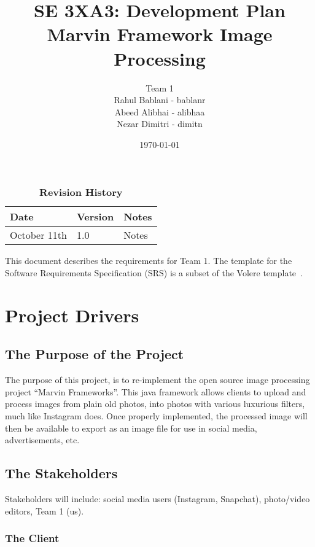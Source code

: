 \documentclass[12pt, titlepage]{article}
\title{SE 3XA3: Development Plan\\Marvin Framework Image Processing}
\author{Team 1 \1
		\\ Rahul Bablani - bablanr
		\\ Abeed Alibhai - alibhaa
		\\ Nezar Dimitri - dimitn
}
\date{\today}
\begin{document}
\maketitle

\tableofcontents
\listoftables
\listoffigures

\begin{table}[bp]
\caption{\bf Revision History}
\begin{tabularx}{\textwidth}{p{3cm}p{2cm}X}
\toprule {\bf Date} & {\bf Version} & {\bf Notes}\\
\midrule
October 11th & 1.0 & Notes\\
\bottomrule
\end{tabularx}
\end{table}

\newpage


This document describes the requirements for Team 1.  The template for the Software Requirements Specification (SRS) is a subset of the Volere
template~\citep{RobertsonAndRobertson2012}.

\section{Project Drivers}

\subsection{The Purpose of the Project}

The purpose of this project, is to re-implement the open source image processing project “Marvin Frameworks”. This java framework allows clients to upload and process images from plain old photos, into photos with various luxurious filters, much like Instagram does. Once properly implemented, the processed image will then be available to export as an image file for use in social media, advertisements, etc.

\subsection{The Stakeholders}

Stakeholders will include: social media users (Instagram, Snapchat), photo/video editors, Team 1 (us).

\subsubsection{The Client}
\end{document}
